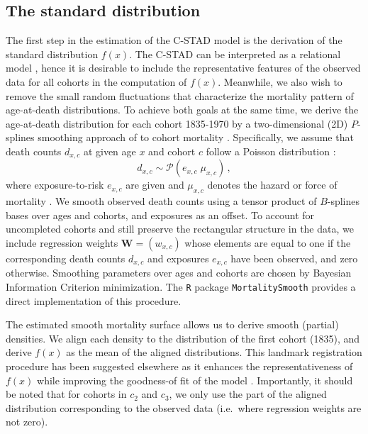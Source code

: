 \documentclass[11pt, a4paper]{article}
\begin{document}
\subsection{The standard distribution}
\label{Subsec:Standard}
The first step in the estimation of the C-STAD model is the derivation of the standard distribution $f(x)$. The C-STAD can be interpreted as a relational model \citep{brass1971scale}, hence it is desirable to include the representative features of the observed data for all cohorts in the computation of $f(x)$. Meanwhile, we also wish to remove the small random fluctuations that characterize the mortality pattern of age-at-death distributions. To achieve both goals at the same time, we derive the age-at-death distribution for each cohort 1835-1970 by a two-dimensional (2D) $P$-splines smoothing approach of to cohort mortality \citep{eilers1996flexible, currie2004smoothing}. Specifically, we assume that death counts $d_{x,c}$ at given age $x$ and cohort $c$ follow a Poisson distribution \citep{brillinger1986biometrics}:
%
\begin{equation}\label{Eq:Poisson}
d_{x,c} \sim \mathcal{P}(e_{x,c} \; \mu_{x,c}) \, ,
\end{equation}
%
where exposure-to-risk $e_{x,c}$ are given and $\mu_{x,c}$ denotes the hazard or force of mortality \cite[such as in, for example,][]{brouhns2002poisson}. We smooth observed death counts using a tensor product of $B$-splines bases over ages and cohorts, and exposures as an offset. To account for uncompleted cohorts and still preserve the rectangular structure in the data, we include regression weights $\bm{W} = (w_{x,c})$ whose elements are equal to one if the corresponding death counts $d_{x,c}$ and exposures $e_{x,c}$ have been observed, and zero otherwise. Smoothing parameters over ages and cohorts are chosen by Bayesian Information Criterion minimization. The \texttt{R} package \texttt{MortalitySmooth} \citep{camarda2012mortalitysmooth} provides a direct implementation of this procedure. 

The estimated smooth mortality surface allows us to derive smooth (partial) densities. We align each density to the distribution of the first cohort (1835), and derive $f(x)$ as the mean of the aligned distributions. This landmark registration procedure has been suggested elsewhere as it enhances the representativeness of $f(x)$ while improving the goodness-of fit of the model \cite[for additional details, see][]{basellini2019modelling}. Importantly, it should be noted that for cohorts in $c_2$ and $c_3$, we only use the part of the aligned distribution corresponding 
to the observed data (i.e.~where regression weights are not zero). 
\end{document}
